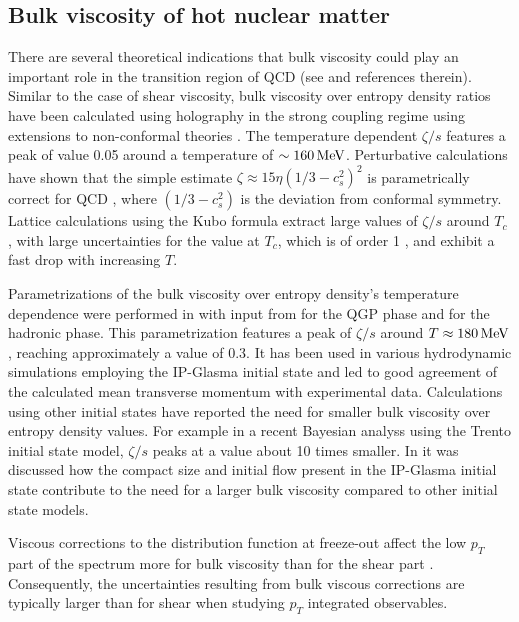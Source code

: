 \subsection{Bulk viscosity of hot nuclear matter}
There are several theoretical indications that bulk viscosity could play an important role in the transition region of QCD (see \cite{Ryu:2017qzn} and references therein). Similar to the case of shear viscosity, bulk viscosity over entropy density ratios have been calculated using holography in the strong coupling regime using extensions to non-conformal theories \cite{Buchel:2007mf,Finazzo:2014cna}. The temperature dependent $\zeta/s$ features a peak of value 0.05 around a temperature of $\sim 160\,{\rm MeV}$. 
Perturbative calculations have shown that the simple estimate $\zeta\approx 15 \eta(1/3-c_s^2)^2$ \cite{Horsley:1985dz} is parametrically correct for QCD \cite{Arnold:2006fz}, where $(1/3-c_s^2)$ is the deviation from conformal symmetry. Lattice calculations using the Kubo formula extract large values of $\zeta/s$ around $T_c$ \cite{Karsch:2007jc,Meyer:2007dy}, with large uncertainties for the value at $T_c$, which is of order 1 \cite{Kharzeev:2007wb}, and exhibit a fast drop with increasing $T$.

Parametrizations of the bulk viscosity over entropy density's temperature dependence were performed in \cite{Denicol:2009am} with input from \cite{Karsch:2007jc} for the QGP phase and \cite{NoronhaHostler:2008ju} for the hadronic phase. This parametrization features a peak of $\zeta/s$ around $T\approx 180\,{\rm MeV}$, reaching approximately a value of 0.3. It has been used in various hydrodynamic simulations employing the IP-Glasma initial state and led to good agreement of the calculated mean transverse momentum with experimental data. Calculations using other initial states have reported the need for smaller bulk viscosity over entropy density values. For example in a recent Bayesian analyss using the Trento initial state model, $\zeta/s$ peaks at a value about 10 times smaller. In \cite{Schenke:2018fci} it was discussed how the compact size and initial flow present in the IP-Glasma initial state contribute to the need for a larger bulk viscosity compared to other initial state models. 

Viscous corrections to the distribution function at freeze-out affect the low $p_T$ part of the spectrum more for bulk viscosity than for the shear part \cite{Bozek:2009dw,Paquet:2015lta}. Consequently, the uncertainties resulting from bulk viscous corrections are typically larger than for shear when studying $p_T$ integrated observables. 

